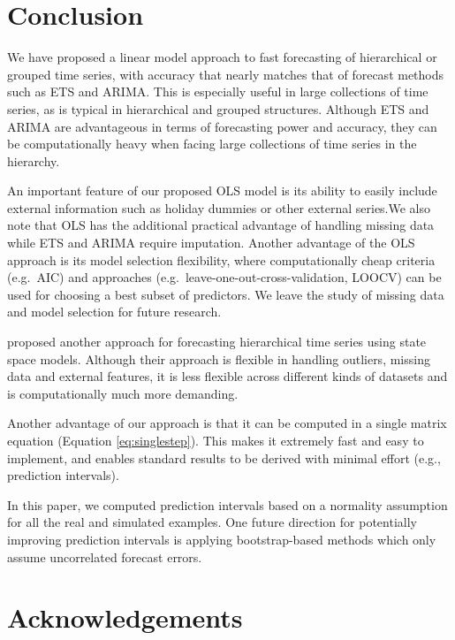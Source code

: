 \documentclass[11pt,a4paper,]{article}
\begin{document}
\FloatBarrier

\hypertarget{conclusion}{%
\section{Conclusion}\label{conclusion}}

We have proposed a linear model approach to fast forecasting of hierarchical or grouped time series, with accuracy that nearly matches that of forecast methods such as ETS and ARIMA. This is especially useful in large collections of time series, as is typical in hierarchical and grouped structures. Although ETS and ARIMA are advantageous in terms of forecasting power and accuracy, they can be computationally heavy when facing large collections of time series in the hierarchy.

An important feature of our proposed OLS model is its ability to easily include external information such as holiday dummies or other external series.We also note that OLS has the additional practical advantage of handling missing data while ETS and ARIMA require imputation. Another advantage of the OLS approach is its model selection flexibility, where computationally cheap criteria (e.g.~AIC) and approaches (e.g.~leave-one-out-cross-validation, LOOCV) can be used for choosing a best subset of predictors. We leave the study of missing data and model selection for future research.

\textcite{pennings2017} proposed another approach for forecasting hierarchical time series using state space models. Although their approach is flexible in handling outliers, missing data and external features, it is less flexible across different kinds of datasets and is computationally much more demanding.

Another advantage of our approach is that it can be computed in a single matrix equation (Equation \eqref{eq:singlestep}). This makes it extremely fast and easy to implement, and enables standard results to be derived with minimal effort (e.g., prediction intervals).

In this paper, we computed prediction intervals based on a normality assumption for all the real and simulated examples. One future direction for potentially improving prediction intervals is applying bootstrap-based methods which only assume uncorrelated forecast errors.

\hypertarget{acknowledgements}{%
\section*{Acknowledgements}\label{acknowledgements}}
\end{document}
